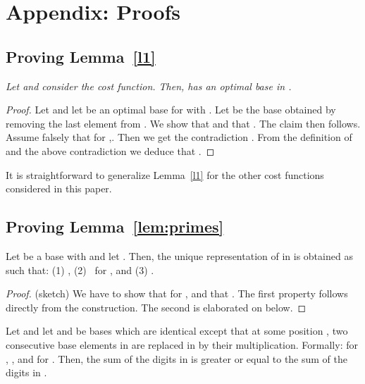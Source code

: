 \documentclass[envcountsame]{llncs}
\begin{document}
\appendix

\section{Appendix: Proofs}\label{apdx}

\newcommand{\apdxtheoremlike}[1]{\par\medskip\penalty-250{\bfseries\scshape\noindent#1}\slshape}

\subsection{Proving Lemma~\ref{l1}}

\noindent\apdxtheoremlike{Lemma~\ref{l1}.}
Let  and consider the  cost
function. Then,  has an optimal base in .


\begin{proof}
  Let  and let  be an optimal base for
   with . Let  be the base obtained by
  removing the last element from .  We show that  and that . The claim then follows.
Assume falsely that for ,\linebreak .
  Then we get the contradiction .
  From the definition of  and the above
  contradiction we deduce that .
\end{proof}

It is straightforward to generalize Lemma~\ref{l1} for the other cost
functions considered in this paper. 

\subsection{Proving Lemma~\ref{lem:primes}} 

\begin{proposition} \label{pNib} Let  be a base with
   and let .  
  Then, the unique representation of  in  is obtained as
   such that:
(1) ,             
(2)  \ for , and
(3) .
\end{proposition}

\begin{proof}(sketch)
  We have to show that for ,  and that 
  . The first property follows directly
  from the construction. The second is elaborated on below.
\end{proof}



\begin{proposition}
\label{pPrimesOnly}
Let  and let  and
 be bases which are identical
except that at some position , two consecutive base
elements in  are replaced in  by their
multiplication. Formally:
 for , 
 , and
  for .
Then, the sum of the digits in  is greater or equal to the
sum of the digits in .
\end{proposition}
\end{document}

